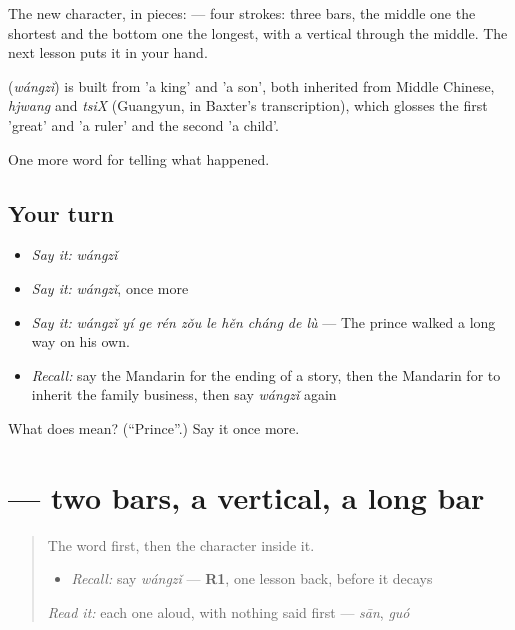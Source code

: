 The new character, in pieces:  — four strokes: three bars, the middle one the shortest and the bottom one the longest, with a vertical through the middle. The next lesson puts it in your hand.

\begin{cousinweb}
\textbf{} (\emph{wángzǐ}) is built from  'a king' and  'a son', both inherited from Middle Chinese, \emph{hjwang} and \emph{tsiX} (Guangyun, in Baxter's transcription), which glosses the first 'great' and 'a ruler' and the second 'a child'.
\end{cousinweb}

\begin{grammarlens}[title={What you've built}]
One more word for telling what happened.
\end{grammarlens}

\subsection*{Your turn}
\begin{itemize}
\raggedright
  \item \emph{Say it:} \emph{wángzǐ}
  \item \emph{Say it:} \emph{wángzǐ}, once more
  \item \emph{Say it:} \emph{wángzǐ yí ge rén zǒu le hěn cháng de lù} — The prince walked a long way on his own.
  \item \emph{Recall:} say the Mandarin for the ending of a story, then the Mandarin for to inherit the family business, then say \emph{wángzǐ} again
\end{itemize}

\begin{tcolorbox}[breakable,colback=teal!4,colframe=teal!35!black,title={Before you move on}]
What does  mean? (\textquotedblleft{}Prince\textquotedblright{}.) Say it once more.
\end{tcolorbox}
\section[\texorpdfstring{\zh{王} (wáng)}{王 (wáng)}]{ — two bars, a vertical, a long bar}

\label{lesson:ZH-W330-wang-king}



\begin{quote}
The word first, then the character inside it.

\begin{itemize}
\raggedright
  \item \emph{Recall:} say \emph{wángzǐ} — \textbf{R1}, one lesson back, before it decays
\end{itemize}

\begin{quote}
 
\end{quote}

\emph{Read it:} each one aloud, with nothing said first — \emph{sān}, \emph{guó}
\end{quote}

